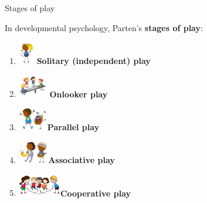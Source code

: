 \documentclass[compress]{beamer}
\begin{document}

{
\begin{frame}[label=parten]{Stages of play}

    In developmental psychology, Parten's {\bf stages of play}:

    \begin{enumerate}
        \item \includegraphics[height=1cm]{figs/stagesofplay/solitary} {\bf Solitary (independent) play}
        \item \includegraphics[height=1cm]{figs/stagesofplay/onlooker} {\bf Onlooker play}
        \item \includegraphics[height=1cm]{figs/stagesofplay/parallel}{\bf Parallel play}
        \item \includegraphics[height=1cm]{figs/stagesofplay/associative}{\bf Associative play}
        \item \includegraphics[height=1cm]{figs/stagesofplay/cooperative}{\bf Cooperative play}
    \end{enumerate}


\end{frame}}
\end{document}
